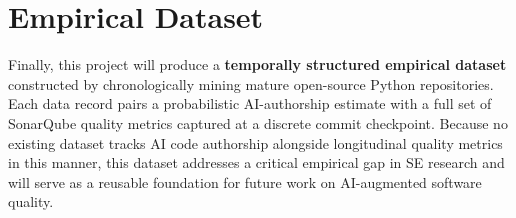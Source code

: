 \section{Empirical Dataset}

Finally, this project will produce a \textbf{temporally structured empirical dataset} constructed by chronologically mining mature open-source Python repositories. Each data record pairs a probabilistic AI-authorship estimate with a full set of SonarQube quality metrics captured at a discrete commit checkpoint. Because no existing dataset tracks AI code authorship alongside longitudinal quality metrics in this manner, this dataset addresses a critical empirical gap in SE research and will serve as a reusable foundation for future work on AI-augmented software quality.
